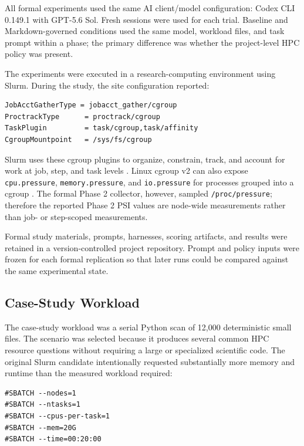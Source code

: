 \documentclass[11pt]{article}
\begin{document}
All formal experiments used the same AI client/model configuration: Codex CLI 0.149.1 with GPT-5.6 Sol. Fresh sessions were used for each trial. Baseline and Markdown-governed conditions used the same model, workload files, and task prompt within a phase; the primary difference was whether the project-level HPC policy was present.

The experiments were executed in a research-computing environment using Slurm. During the study, the site configuration reported:

\begin{lstlisting}
JobAcctGatherType = jobacct_gather/cgroup
ProctrackType      = proctrack/cgroup
TaskPlugin         = task/cgroup,task/affinity
CgroupMountpoint   = /sys/fs/cgroup
\end{lstlisting}

Slurm uses these cgroup plugins to organize, constrain, track, and account for work at job, step, and task levels \citep{slurmcgroups,slurmcgroupv2}. Linux cgroup v2 can also expose \texttt{cpu.pressure}, \texttt{memory.pressure}, and \texttt{io.pressure} for processes grouped into a cgroup \citep{linuxpsi,linuxcgroupv2}. The formal Phase 2 collector, however, sampled \texttt{/proc/pressure}; therefore the reported Phase 2 PSI values are node-wide measurements rather than job- or step-scoped measurements.

Formal study materials, prompts, harnesses, scoring artifacts, and results were retained in a version-controlled project repository. Prompt and policy inputs were frozen for each formal replication so that later runs could be compared against the same experimental state.

\subsection{Case-Study Workload}

The case-study workload was a serial Python scan of 12,000 deterministic small files. The scenario was selected because it produces several common HPC resource questions without requiring a large or specialized scientific code. The original Slurm candidate intentionally requested substantially more memory and runtime than the measured workload required:

\begin{lstlisting}
#SBATCH --nodes=1
#SBATCH --ntasks=1
#SBATCH --cpus-per-task=1
#SBATCH --mem=20G
#SBATCH --time=00:20:00
\end{lstlisting}
\end{document}

